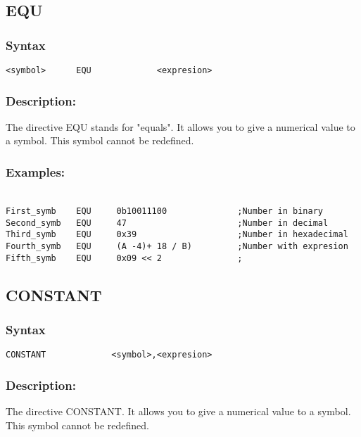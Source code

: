     \subsection{EQU}
        \subsubsection{Syntax}
            \verb'<symbol>      EQU             <expresion> '

        \subsubsection{Description:}
                The directive EQU stands for "equals". It allows you to give a numerical value to a symbol. This symbol cannot be redefined.

        \subsubsection{Examples:}
        {
            ~\\
            \usecodefont
            \verb'First_symb    EQU     0b10011100              ;Number in binary'\\
            \verb'Second_symb   EQU     47                      ;Number in decimal'\\
            \verb'Third_symb    EQU     0x39                    ;Number in hexadecimal'\\
            \verb'Fourth_symb   EQU     (A -4)+ 18 / B)         ;Number with expresion'\\
            \verb'Fifth_symb    EQU     0x09 << 2               ;'\\
        }

    \subsection{CONSTANT}
        \subsubsection{Syntax}
            \verb'CONSTANT             <symbol>,<expresion>'

        \subsubsection{Description:}
                The directive CONSTANT. It allows you to give a numerical value to a symbol. This symbol cannot be redefined.

